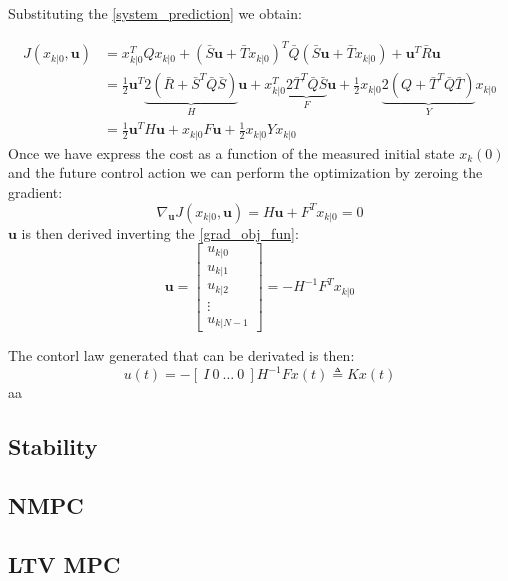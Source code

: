 Substituting the \ref{system_prediction} we obtain:

\begin{equation}
\begin{split} 
 J(x_{k|0},\textbf{u})&=x_{k|0}^T Q x_{k|0} + (\bar{S}\textbf{u}+\bar{T}x_{k|0})^T\bar{Q}(\bar{S}\textbf{u}+\bar{T}x_{k|0}) + \textbf{u}^T\bar{R}\textbf{u} \\ 
 &= \frac{1}{2}\textbf{u}^T \underbrace{2(\bar{R}+\bar{S}^T\bar{Q}\bar{S})}_{H}\textbf{u} + x_{k|0}^T\underbrace{2\bar{T}^T\bar{Q}\bar{S}}_{F}\textbf{u}+\frac{1}{2}x_{k|0}\underbrace{2(Q+\bar{T}^T\bar{Q}\bar{T})}_{Y}x_{k|0} \\
 &=\frac{1}{2}\textbf{u}^TH\textbf{u}+x_{k|0}F\textbf{u}+\frac{1}{2}x_{k|0}Yx_{k|0}
 \end{split}
\end{equation}
Once we have express the cost as a function of the measured initial state $x_k(0)$ and the future control action we can perform the optimization by zeroing the gradient:
\begin{equation}
	\nabla_\textbf{u}J(x_{k|0},\textbf{u})=H\textbf{u}+F^Tx_{k|0}=0
\end{equation}
\label{grad_obj_fun}
$\textbf{u}$ is then derived inverting the \ref{grad_obj_fun}:
\begin{equation*}
	\textbf{u}= \left[
	\begin{matrix}
			u_{k|0} \\ u_{k|1} \\ u_{k|2} \\ \vdots \\ u_{k|N-1}
	\end{matrix}\right] = -H^{-1}F^Tx_{k|0}
\end{equation*} 

The contorl law generated that can be derivated is then:
\begin{equation}
u(t)=-\left[\ I\ 0\ \dots\  0\ \right]H^{-1}Fx(t)\triangleq Kx(t)
\end{equation}
aa


 


\subsection{Stability}
\subsection{NMPC}
\subsection{LTV MPC} %
